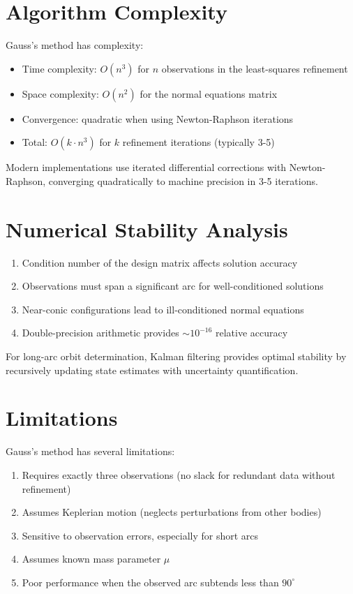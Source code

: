 \section{Algorithm Complexity}

Gauss's method has complexity:
\begin{itemize}
    \item Time complexity: $O(n^3)$ for $n$ observations in the least-squares refinement
    \item Space complexity: $O(n^2)$ for the normal equations matrix
    \item Convergence: quadratic when using Newton-Raphson iterations
    \item Total: $O(k \cdot n^3)$ for $k$ refinement iterations (typically 3-5)
\end{itemize}

Modern implementations use iterated differential corrections with Newton-Raphson, converging quadratically to machine precision in 3-5 iterations.

\section{Numerical Stability Analysis}

\begin{enumerate}
    \item Condition number of the design matrix affects solution accuracy
    \item Observations must span a significant arc for well-conditioned solutions
    \item Near-conic configurations lead to ill-conditioned normal equations
    \item Double-precision arithmetic provides $\sim 10^{-16}$ relative accuracy
\end{enumerate}

For long-arc orbit determination, Kalman filtering provides optimal stability by recursively updating state estimates with uncertainty quantification.

\section{Limitations}

Gauss's method has several limitations:
\begin{enumerate}
    \item Requires exactly three observations (no slack for redundant data without refinement)
    \item Assumes Keplerian motion (neglects perturbations from other bodies)
    \item Sensitive to observation errors, especially for short arcs
    \item Assumes known mass parameter $\mu$
    \item Poor performance when the observed arc subtends less than $90^\circ$
\end{enumerate}

